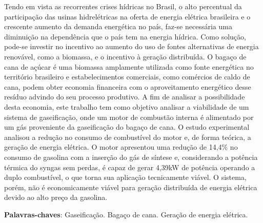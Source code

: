 \begin{resumo}

Tendo em vista as recorrentes crises hídricas no Brasil, o alto percentual da participação das usinas hidrelétricas na oferta de energia elétrica brasileira e o crescente aumento da demanda energética no país, faz-se necessária uma diminuição na dependência que o país tem na energia hídrica. Como solução, pode-se investir no incentivo ao aumento do uso de fontes alternativas de energia renovável, como a biomassa, e o incentivo à geração distribuída. O bagaço de cana de açúcar é uma biomassa amplamente utilizada como fonte energética no território brasileiro e estabelecimentos comerciais, como comércios de caldo de cana, podem obter economia financeira com o aproveitamento energético desse resíduo advindo do seu processo produtivo. A fim de analisar a possibilidade desta economia, este trabalho tem como objetivo analisar a viabilidade de um sistema de gaseificação, onde um motor de combustão interna é alimentado por um gás proveniente da gaseificação do bagaço de cana. O estudo experimental analisou a redução no consumo de combustível do motor e, de forma teórica, a geração de energia elétrica. O motor apresentou uma redução de 14,4\% no consumo de gasolina com a inserção do gás de síntese e, considerando a potência térmica do syngas sem perdas, é capaz de gerar 4,39kW de potência operando a duplo combustível, o que torna sua aplicação tecnicamente viável. O sistema, porém, não é economicamente viável para geração distribuída de energia elétrica devido ao alto preço da gasolina. 

 \vspace{\onelineskip}
    
 \noindent
 \textbf{Palavras-chaves}: Gaseificação. Bagaço de cana. Geração de energia elétrica.
\end{resumo}
